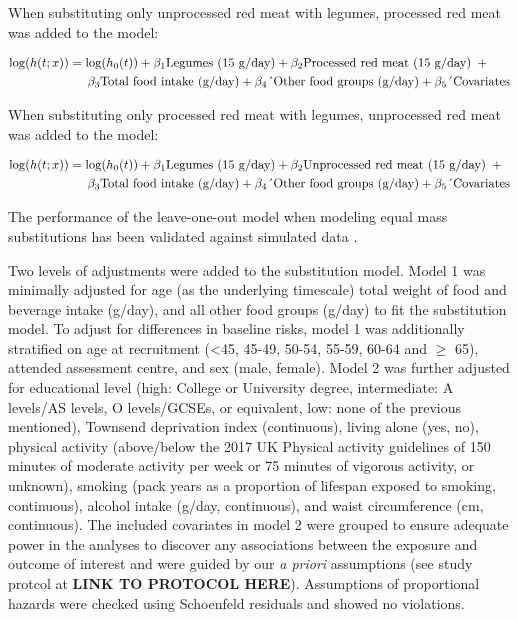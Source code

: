 \documentclass[nutrients,article,submit,moreauthors,pdftex]{Definitions/mdpi}
\begin{document}
\noindent When substituting only unprocessed red meat with legumes,
processed red meat was added to the model:

{\small
\begin{align}
\log(h(t;x)) &= \log(h_0(t)) + \beta_1 \text{Legumes (15 g/day)} + \beta_2 \text{Processed red meat (15 g/day)} \hspace{0.5em} + \nonumber \\
&\quad \hspace{0.5em} \beta_3 \text{Total food intake (g/day)} + \beta_4 \text{´Other food groups (g/day)} + \beta_5 \text{´Covariates}
\end{align}
}

\noindent When substituting only processed red meat with legumes,
unprocessed red meat was added to the model:

{\small
\begin{align}
\log(h(t;x)) &= \log(h_0(t)) + \beta_1 \text{Legumes (15 g/day)} + \beta_2 \text{Unprocessed red meat (15 g/day)} \hspace{0.5em} + \nonumber \\
&\quad \hspace{0.5em} \beta_3 \text{Total food intake (g/day)}  + \beta_4 \text{´Other food groups (g/day)} + \beta_5 \text{´Covariates}
\end{align}
}

\noindent The performance of the leave-one-out model when modeling equal
mass substitutions has been validated against simulated data
\citep{Tomova2022}.

Two levels of adjustments were added to the substitution model. Model 1
was minimally adjusted for age (as the underlying timescale) total
weight of food and beverage intake (g/day), and all other food groups
(g/day) to fit the substitution model. To adjust for differences in
baseline risks, model 1 was additionally stratified on age at
recruitment (\textless45, 45-49, 50-54, 55-59, 60-64 and \(\geq\) 65), attended
assessment centre, and sex (male, female). Model 2 was further adjusted
for educational level (high: College or University degree, intermediate:
A levels/AS levels, O levels/GCSEs, or equivalent, low: none of the
previous mentioned), Townsend deprivation index (continuous), living
alone (yes, no), physical activity (above/below the 2017 UK Physical
activity guidelines of 150 minutes of moderate activity per week or 75
minutes of vigorous activity, or unknown), smoking (pack years as a
proportion of lifespan exposed to smoking, continuous), alcohol intake
(g/day, continuous), and waist circumference (cm, continuous). The
included covariates in model 2 were grouped to ensure adequate power in
the analyses to discover any associations between the exposure and
outcome of interest and were guided by our \emph{a priori} assumptions (see
study protcol at \textbf{LINK TO PROTOCOL HERE}). Assumptions of proportional
hazards were checked using Schoenfeld residuals and showed no
violations.
\end{document}
